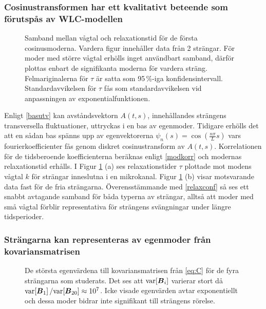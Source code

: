 \subsubsection{Cosinustransformen har ett kvalitativt beteende som förutspås av WLC-modellen}

\begin{figure}
    \centerline{
    \subfigure[][]{
    \label{fig:cosconf}
    }
    \subfigure[][]{
    \label{fig:cosnonconf}
    }}
    \caption{Samband mellan vågtal och relaxationstid för de första cosinusmoderna. Vardera figur innehåller data från 2 strängar. För moder med större vågtal erhölls inget användbart samband, därför plottas enbart de signifikanta moderna för vardera sträng. Felmariginalerna för $\tau$ är satta som 95\,\%-iga konfidensintervall. Standardavvikelsen för $\tau$ fås som standardavvikelsen vid anpassningen av exponentialfunktionen.}
    \label{fig:cosmoder}
\end{figure}

Enligt \eqref{basutv} kan avståndsvektorn $A(t,s)$, innehållandes strängens transversella 
fluktuationer, uttryckas i en bas av egenmoder. Tidigare erhölls det att en sådan bas spänns upp av egenvektorerna $\psi_{n}(s)=\cos({\frac{n\pi}{L}s})$ vars fourierkoefficienter fås genom diskret cosinustransform av $A(t,s)$. Korrelationen för de tidsberoende koefficienterna beräknas enligt \eqref{modkorr} och modernas relaxationstid erhålls. I Figur \ref{fig:cosmoder} (a) ses relaxationstider $\tau$ plottade mot modens vågtal $k$ för strängar inneslutna i en mikrokanal. Figur \ref{fig:cosmoder} (b) visar motsvarande data fast för de fria strängarna. Överensstämmande med \eqref{relaxconf} så ses ett snabbt avtagande samband för båda typerna av strängar, alltså att moder med små vågtal förblir representativa för strängens svängningar under längre tidsperioder.




\subsubsection{Strängarna kan representeras av egenmoder från kovariansmatrisen}

\begin{figure}
    \centering
    
    \caption{De största egenvärdena till kovariansmatrisen från \eqref{eq:C} för de fyra strängarna som studerats. Det ses att $\text{var}\!\left[\boldsymbol{B}_i\right]$ varierar stort då $\text{var}\!\left[\boldsymbol{B}_1\right]/\text{var}\!\left[\boldsymbol{B}_{20}\right]\approx10^7$. Icke visade egenvärden avtar exponentiellt och dessa moder bidrar inte signifikant till strängens rörelse.}
    \label{fig:kovegenvarde}
\end{figure}

